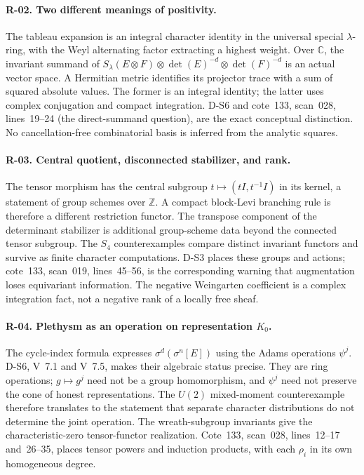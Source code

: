 \documentclass[11pt,a4paper]{article}
\theoremstyle{definition}\newtheorem{definition}{Definition}
\begin{document}
\paragraph{R-02. Two different meanings of positivity.}
The tableau expansion is an integral character identity in the universal special $\lambda$-ring, with the Weyl alternating factor extracting a highest weight. Over $\mathbb C$, the invariant summand of $S_\lambda(E\otimes F)\otimes\det(E)^{-d}\otimes\det(F)^{-d}$ is an actual vector space. A Hermitian metric identifies its projector trace with a sum of squared absolute values. The former is an integral identity; the latter uses complex conjugation and compact integration. D-S6 and cote~133, scan~028, lines~19--24 (the direct-summand question), are the exact conceptual distinction. No cancellation-free combinatorial basis is inferred from the analytic squares.

\paragraph{R-03. Central quotient, disconnected stabilizer, and rank.}
The tensor morphism has the central subgroup $t\mapsto(tI,t^{-1}I)$ in its kernel, a statement of group schemes over $\mathbb Z$. A compact block-Levi branching rule is therefore a different restriction functor. The transpose component of the determinant stabilizer is additional group-scheme data beyond the connected tensor subgroup. The $S_4$ counterexamples compare distinct invariant functors and survive as finite character computations. D-S3 places these groups and actions; cote~133, scan~019, lines~45--56, is the corresponding warning that augmentation loses equivariant information. The negative Weingarten coefficient is a complex integration fact, not a negative rank of a locally free sheaf.

\paragraph{R-04. Plethysm as an operation on representation $K_0$.}
The cycle-index formula expresses $\sigma^d(\sigma^n[E])$ using the Adams operations $\psi^j$. D-S6, V~7.1 and V~7.5, makes their algebraic status precise. They are ring operations; $g\mapsto g^j$ need not be a group homomorphism, and $\psi^j$ need not preserve the cone of honest representations. The $U(2)$ mixed-moment counterexample therefore translates to the statement that separate character distributions do not determine the joint operation. The wreath-subgroup invariants give the characteristic-zero tensor-functor realization. Cote~133, scan~028, lines~12--17 and~26--35, places tensor powers and induction products, with each $\rho_i$ in its own homogeneous degree.
\end{document}
